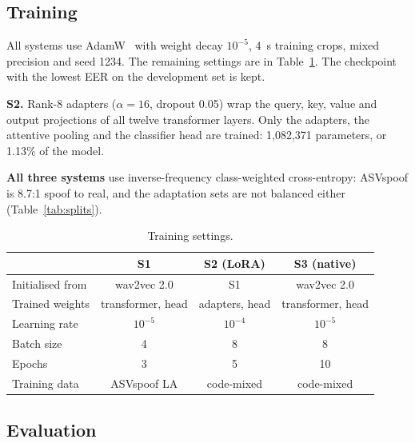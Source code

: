 \subsection{Training}
\label{sec:training}

All systems use AdamW~\cite{loshchilov2019adamw} with weight decay $10^{-5}$, 4~s training crops, mixed
precision and seed 1234. The remaining settings are in Table~\ref{tab:hparams}.
The checkpoint with the lowest EER on the development set is kept.

\textbf{S2.} Rank-8 adapters ($\alpha = 16$, dropout 0.05) wrap the query, key,
value and output projections of all twelve transformer layers. Only the adapters, the
attentive pooling and the classifier head are trained: 1{,}082{,}371 parameters, or
1.13\% of the model.

\textbf{All three systems} use inverse-frequency class-weighted cross-entropy: ASVspoof
is 8.7:1 spoof to real, and the adaptation sets are not balanced either
(Table~\ref{tab:splits}).

\begin{table}[t]
\centering
\caption{Training settings.}
\label{tab:hparams}
\footnotesize
\setlength{\tabcolsep}{3pt}
\begin{tabular}{@{}lccc@{}}
\toprule
                 & S1 & S2 (LoRA) & S3 (native) \\
\midrule
Initialised from & wav2vec 2.0 & S1 & wav2vec 2.0 \\
Trained weights  & transformer, head & adapters, head & transformer, head \\
Learning rate    & $10^{-5}$ & $10^{-4}$ & $10^{-5}$ \\
Batch size       & 4 & 8 & 8 \\
Epochs           & 3 & 5 & 10 \\
Training data    & ASVspoof LA & code-mixed & code-mixed \\
\bottomrule
\end{tabular}
\end{table}

\subsection{Evaluation}
\label{sec:eval}

